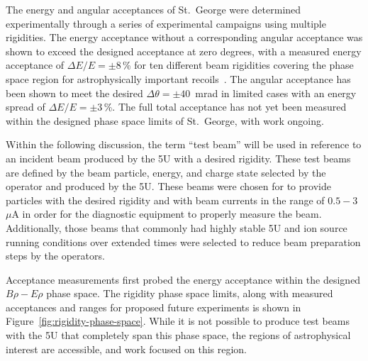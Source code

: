 The energy and angular acceptances of St.\ George were determined
experimentally through a series of experimental campaigns using multiple
rigidities. The energy acceptance without a corresponding angular acceptance
was shown to exceed the designed acceptance at zero degrees, with a measured
energy acceptance of $\Delta E/E = \pm 8$\,\% for ten different beam
rigidities covering the phase space region for astrophysically important
recoils~\cite{Meisel2017}. The angular acceptance has been shown to meet the
desired $\Delta\theta = \pm 40$~mrad in limited cases with an energy spread of
$\Delta E/E = \pm 3$\,\%. The full total acceptance has not yet been measured
within the designed phase space limits of St.\ George, with work ongoing.

Within the following discussion, the term ``test beam'' will be used in
reference to an incident beam produced by the 5U with a desired rigidity. These
test beams are defined by the beam particle, energy, and charge state selected
by the operator and produced by the 5U. These beams were chosen for to
provide particles with the desired rigidity and with beam currents in the range
of $0.5 - 3$~$\mu$A in order for the diagnostic equipment to properly measure
the beam. Additionally, those beams that commonly had highly stable 5U and ion
source running conditions over extended times were selected to reduce beam
preparation steps by the operators.

Acceptance measurements first probed the energy acceptance within the designed
$B\rho-E\rho$ phase space. The rigidity phase space
limits, along with measured acceptances and ranges for proposed future
experiments is shown in Figure~\ref{fig:rigidity-phase-space}. While it is not
possible to produce test beams with the 5U that completely span this phase
space, the regions of astrophysical interest are accessible, and work focused
on this region.

